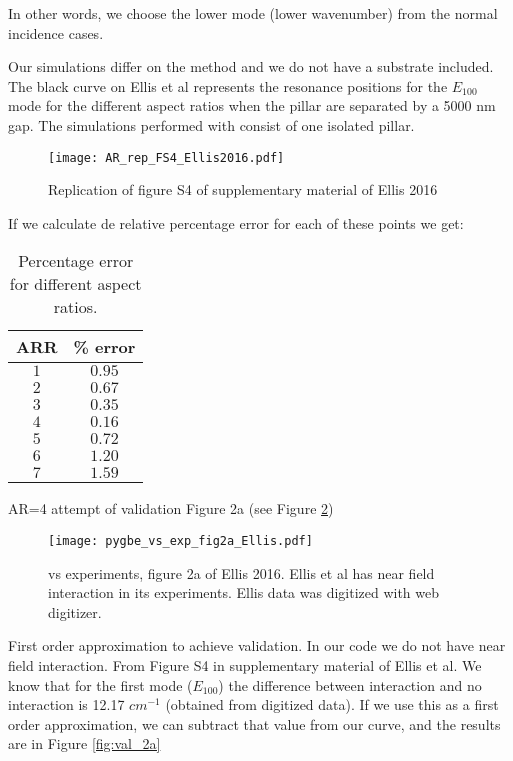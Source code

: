 In other words, we choose the lower mode (lower wavenumber) from the normal 
incidence cases.

Our simulations differ on the method and we do not have a substrate included. The black curve on 
Ellis et al \cite{ellis2016} represents the resonance positions for the $E_{100}$ mode for the different 
aspect ratios when the pillar are separated by a 5000 nm gap. The simulations performed with \pygbe 
consist of one isolated pillar.

\begin{figure}
    \centering
    \texttt{[image: AR\_rep\_FS4\_Ellis2016.pdf]} 
    \caption{Replication of figure S4 of supplementary material of Ellis 2016}
    \label{fig:rep_FS4_ellis}
 \end{figure}

 If we calculate de relative percentage error for each of these points we get:
 
 \begin{table}
    \centering
    \caption{\label{table:err_AR} Percentage error for different aspect ratios.} 
    \begin{tabular}{c c}
    \hline%
    ARR & \% error \\
    \hline%
     $1$ & $0.95$ \\
     $2$ & $0.67$ \\
     $3$ & $0.35$ \\
     $4$ & $0.16$ \\
     $5$ & $0.72$ \\
     $6$ & $1.20$ \\
     $7$ & $1.59$ \\
    \hline%
    \end{tabular}
\end{table}


\pygbe AR=4 attempt of validation Figure 2a (see Figure \ref{fig:pygbe_vs_exp_2a})

\begin{figure}
    \centering
    \texttt{[image: pygbe\_vs\_exp\_fig2a\_Ellis.pdf]} 
    \caption{\pygbe vs experiments, figure 2a of Ellis 2016. Ellis et al 
    has near field interaction in its experiments. Ellis data was digitized
    with web digitizer.}
    \label{fig:pygbe_vs_exp_2a}
 \end{figure}

First order approximation to achieve validation. In our code we do not have near 
field interaction. From Figure S4 in supplementary material of Ellis et al. We know that 
for the first mode ($E_{100}$) the difference between interaction and no interaction is 
12.17 $cm^{-1}$ (obtained from digitized data). If we use this as a first order approximation,
we can subtract that value from our curve, and the results are in Figure \ref{fig:val_2a}

